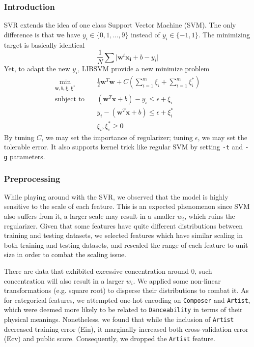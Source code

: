 \documentclass[10pt,letterpaper]{article}
\begin{document}
\subsubsection{Introduction}

SVR extends the idea of one class Support Vector Machine (SVM). The only difference is that we have $y_i \in \{0, 1, \dots, 9\}$ instead of $y_i \in \{-1, 1\}$. The minimizing target is basically identical
$$
	\frac{1}{N} \sum \lvert \mathbf{w}^t \mathbf{x_i} + b - y_i \rvert
$$
Yet, to adapt the new $y_i$, LIBSVM provide a new minimize problem
\begin{align*}
	\underset{\mathbf{w}, b, \mathbf{\xi}, \mathbf{\xi^*}}{\min} \quad & \frac{1}{2}\mathbf{w}^T\mathbf{w} + C\left(\sum_{i=1}^m \xi_i + \sum_{i=1}^m \xi^*_i\right) \\
	\text{subject to} \quad & (\mathbf{w}^T \mathbf{x} + b) - y_i \le \epsilon + \xi_i \\
	& y_i - (\mathbf{w}^T \mathbf{x} + b) \le \epsilon + \xi^*_i \\
	& \xi_i, \xi^*_i \ge 0
\end{align*}
By tuning $C$, we may set the importance of regularizer; tuning $\epsilon$, we may set the tolerable error. It also supports kernel trick like regular SVM by setting \texttt{-t} and \texttt{-g} parameters. 

\subsubsection{Preprocessing}

While playing around with the SVR, we observed that the model is highly sensitive to the scale of each feature. This is an expected phenomenon since SVM also suffers from it, a larger scale may result in a smaller $w_i$, which ruins the regularizer. Given that some features have quite different distributions between training and testing datasets, we selected features which have similar scaling in both training and testing datasets, and rescaled the range of each feature to unit size in order to combat the scaling issue. 

There are data that exhibited excessive concentration around $0$, such concentration will also result in a larger $w_i$. We applied some non-linear transformations (e.g. square root) to disperse their distributions to combat it. As for categorical features, we attempted one-hot encoding on \texttt{Composer} and \texttt{Artist}, which were deemed more likely to be related to \texttt{Danceability} in terms of their physical meanings. Nonetheless, we found that while the inclusion of \texttt{Artist} decreased training error (Ein), it marginally increased both cross-validation error (Ecv) and public score. Consequently, we dropped the \texttt{Artist} feature.
\end{document}
